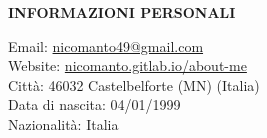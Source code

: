 \begin{minipage}[t]{0.3\textwidth}
		\textbf{INFORMAZIONI PERSONALI}
\end{minipage}%
\hfill
\hfill
\begin{minipage}[t]{0.6\textwidth}
	Email: \href{mailto:me@somewhere.com}{nicomanto49@gmail.com} \\
	Website: \url{nicomanto.gitlab.io/about-me}\\
	Città: 46032 Castelbelforte (MN) (Italia) \\
	Data di nascita: 04/01/1999 \\
	Nazionalità: Italia\\
\end{minipage}%


